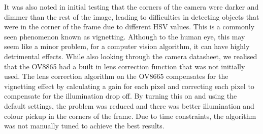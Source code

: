 \documentclass[a4paper]{article}
\begin{document}
    It was also noted in 
    initial testing that the corners of the camera were darker and dimmer than the rest 
    of the image, leading to difficulties in detecting objects that were in the corner
    of the frame due to different HSV values. This is a commonly seen phenomenon known as vignetting.
    Although to the human eye, this may seem
    like a minor problem, for a computer vision algorithm, it can have highly detrimental 
    effects. \cite{zheng2008single} While also looking through the camera datasheet, 
    we realised that the OV8865 had a built in lens correction function that was not initially
    used. The lens correction algorithm on the OV8665 compensates for the vignetting effect by 
    calculating a gain for each pixel and correcting each pixel to compensate for the illumination
    drop off. \cite{OV8865DataSheet} By turning this on and using the default settings, 
    the problem was reduced and there was better illumination and colour pickup in the corners
    of the frame. Due to time constraints, the algorithm was not manually tuned to achieve
    the best results. 
    
\end{document}
